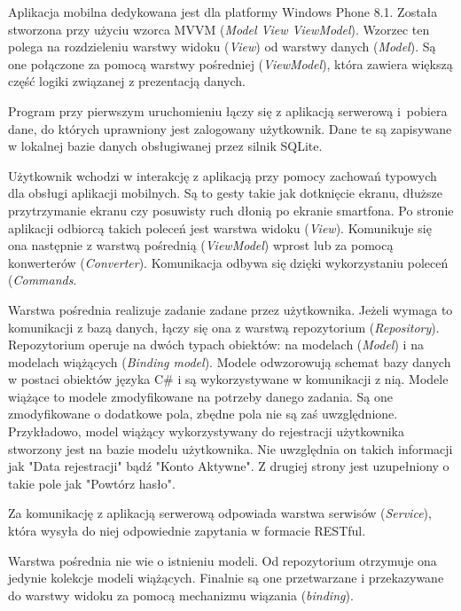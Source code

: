 \documentclass{book}
\begin{document}
			Aplikacja mobilna dedykowana jest dla platformy Windows Phone 8.1. Została stworzona przy użyciu wzorca MVVM (\emph{Model View ViewModel}). Wzorzec ten polega na rozdzieleniu warstwy widoku (\emph{View}) od warstwy danych (\emph{Model}). Są one połączone za pomocą warstwy pośredniej (\emph{ViewModel}), która zawiera większą część logiki związanej z prezentacją danych. 
			
			Program przy pierwszym uruchomieniu łączy się z aplikacją serwerową i~pobiera dane, do których uprawniony jest zalogowany użytkownik. Dane te są zapisywane w lokalnej bazie danych obsługiwanej przez silnik SQLite. 
			
			Użytkownik wchodzi w interakcję z aplikacją przy pomocy zachowań typowych dla obsługi aplikacji mobilnych. Są to gesty takie jak dotknięcie ekranu, dłuższe przytrzymanie ekranu czy posuwisty ruch dłonią po ekranie smartfona. 
			Po stronie aplikacji odbiorcą takich poleceń jest warstwa widoku (\emph{View}). Komunikuje się ona następnie z warstwą pośrednią (\emph{ViewModel}) wprost lub za pomocą konwerterów (\emph{Converter}). Komunikacja odbywa się dzięki wykorzystaniu poleceń (\emph{Commands}. 
			
			Warstwa pośrednia realizuje zadanie zadane przez użytkownika. Jeżeli wymaga to komunikacji z bazą danych, łączy się ona z warstwą repozytorium (\emph{Repository}). Repozytorium operuje na dwóch typach obiektów: na modelach (\emph{Model}) i na modelach wiążących (\emph{Binding model}). Modele odwzorowują schemat bazy danych w postaci obiektów języka C\# i są wykorzystywane w komunikacji z nią. Modele wiążące to modele zmodyfikowane na potrzeby danego zadania.  %
			Są one zmodyfikowane o dodatkowe pola, zbędne pola nie są zaś uwzględnione. Przykładowo, model wiążący wykorzystywany do rejestracji użytkownika stworzony jest na bazie modelu użytkownika. Nie uwzględnia on takich informacji jak "Data rejestracji" bądź "Konto Aktywne". Z drugiej strony jest uzupełniony o takie pole jak "Powtórz hasło".
			
			Za komunikację z aplikacją serwerową odpowiada warstwa serwisów (\emph{Service}), która wysyła do niej odpowiednie zapytania w formacie RESTful. 
			
			Warstwa pośrednia nie wie o istnieniu modeli. Od repozytorium otrzymuje ona jedynie kolekcje modeli wiążących. Finalnie są one przetwarzane i przekazywane do warstwy widoku za pomocą mechanizmu wiązania (\emph{binding}).
			
\end{document}
